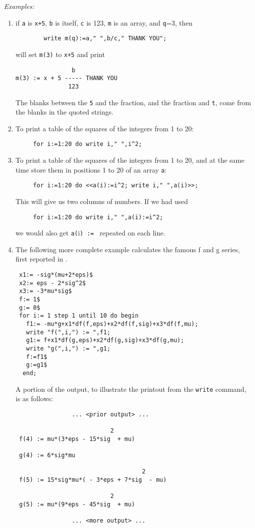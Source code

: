 \textit{Examples:}
\begin{enumerate}
\item if \texttt{a} is \texttt{x+5}, \texttt{b} is itself, \texttt{c} is 123, \texttt{m} is
an array, and \texttt{q}=3, then
\begin{verbatim}
        write m(q):=a," ",b/c," THANK YOU";
\end{verbatim}
will set \texttt{m(3)} to \texttt{x+5} and print
\begin{verbatim}
                b
m(3) := x + 5 ----- THANK YOU
               123
\end{verbatim}
The blanks between the \texttt{5} and the fraction, and the fraction
and \texttt{t}, come from the blanks in the quoted strings.

\item To print a table of the squares of the integers from 1 to 20:
\begin{verbatim}
     for i:=1:20 do write i," ",i^2;
\end{verbatim}

\item To print a table of the squares of the integers from 1 to 20, and at
the same time store them in positions 1 to 20 of an array \texttt{a}:
\begin{verbatim}
     for i:=1:20 do <<a(i):=i^2; write i," ",a(i)>>;
\end{verbatim}
This will give us two columns of numbers. If we had used
\begin{verbatim}
     for i:=1:20 do write i," ",a(i):=i^2;
\end{verbatim}
we would also get \texttt{a(}i\texttt{) := } repeated on each line.

\item The following more complete example calculates the famous f and g
series, first reported in \cite{Sconzo1965SymbolicCO}.
\begin{verbatim}
 x1:= -sig*(mu+2*eps)$
 x2:= eps - 2*sig^2$
 x3:= -3*mu*sig$
 f:= 1$
 g:= 0$
 for i:= 1 step 1 until 10 do begin
   f1:= -mu*g+x1*df(f,eps)+x2*df(f,sig)+x3*df(f,mu);
   write "f(",i,") := ",f1;
   g1:= f+x1*df(g,eps)+x2*df(g,sig)+x3*df(g,mu);
   write "g(",i,") := ",g1;
   f:=f1$
   g:=g1$
  end;
\end{verbatim}
A portion of the output, to illustrate the printout from the \texttt{write}
command, is as follows:
\begin{verbatim}
                ... <prior output> ...

                           2
 f(4) := mu*(3*eps - 15*sig  + mu)

 g(4) := 6*sig*mu

                                    2
 f(5) := 15*sig*mu*( - 3*eps + 7*sig  - mu)

                           2
 g(5) := mu*(9*eps - 45*sig  + mu)

                ... <more output> ...

\end{verbatim}
\end{enumerate}

